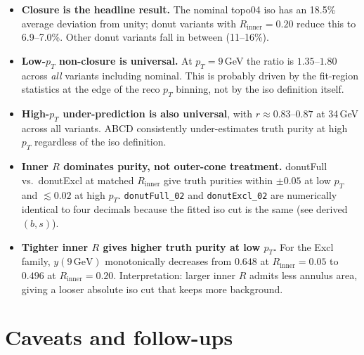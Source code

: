 \documentclass[11pt,a4paper]{article}
\begin{document}
\begin{itemize}
  \item \textbf{Closure is the headline result.} The nominal topo04 iso
    has an 18.5\% average deviation from unity; donut variants with
    $R_\mathrm{inner} = 0.20$ reduce this to 6.9--7.0\%. Other donut
    variants fall in between (11--16\%).
  \item \textbf{Low-$p_T$ non-closure is universal.}
    At $p_T = 9$\,GeV the ratio is $1.35$--$1.80$ across \emph{all}
    variants including nominal. This is probably driven by the fit-region
    statistics at the edge of the reco $p_T$ binning, not by the iso
    definition itself.
  \item \textbf{High-$p_T$ under-prediction is also universal}, with
    $r \approx 0.83$--$0.87$ at 34\,GeV across all variants. ABCD consistently
    under-estimates truth purity at high $p_T$ regardless of the iso
    definition.
  \item \textbf{Inner $R$ dominates purity, not outer-cone treatment.}
    donutFull vs.\ donutExcl at matched $R_\mathrm{inner}$ give truth
    purities within $\pm 0.05$ at low $p_T$ and $\lesssim 0.02$ at high
    $p_T$. \texttt{donutFull\_02} and \texttt{donutExcl\_02} are
    numerically identical to four decimals because the fitted iso cut is
    the same (see derived $(b, s)$).
  \item \textbf{Tighter inner $R$ gives higher truth purity at low $p_T$.}
    For the Excl family, $y(9\,\mathrm{GeV})$ monotonically decreases
    from $0.648$ at $R_\mathrm{inner} = 0.05$ to $0.496$ at $R_\mathrm{inner} = 0.20$.
    Interpretation: larger inner $R$ admits less annulus area, giving a
    looser absolute iso cut that keeps more background.
\end{itemize}

\section*{Caveats and follow-ups}
\end{document}
